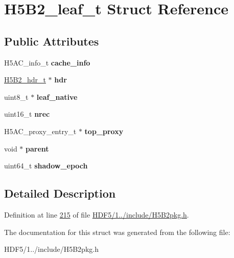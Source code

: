 \hypertarget{struct_h5_b2__leaf__t}{}\section{H5\+B2\+\_\+leaf\+\_\+t Struct Reference}
\label{struct_h5_b2__leaf__t}
\subsection*{Public Attributes}
\begin{DoxyCompactItemize}
\item 
\mbox{\label{struct_h5_b2__leaf__t_a804fee118c703417b7acca25cd627eda}} 
H5\+A\+C\+\_\+info\+\_\+t {\bfseries cache\+\_\+info}
\item 
\mbox{\label{struct_h5_b2__leaf__t_ae326044c2d829b66e1a9bde3e0ae09bc}} 
\hyperlink{struct_h5_b2__hdr__t}{H5\+B2\+\_\+hdr\+\_\+t} $\ast$ {\bfseries hdr}
\item 
\mbox{\label{struct_h5_b2__leaf__t_adacb0926a7bd038a30141629040e357d}} 
uint8\+\_\+t $\ast$ {\bfseries leaf\+\_\+native}
\item 
\mbox{\label{struct_h5_b2__leaf__t_adca946f053f22ff0dd5d26ead3487a3b}} 
uint16\+\_\+t {\bfseries nrec}
\item 
\mbox{\label{struct_h5_b2__leaf__t_ad12a0eeb297e28b97c6ad26824926f58}} 
H5\+A\+C\+\_\+proxy\+\_\+entry\+\_\+t $\ast$ {\bfseries top\+\_\+proxy}
\item 
\mbox{\label{struct_h5_b2__leaf__t_a54fc83eb3ccb8a5ff2a91a927547f4b2}} 
void $\ast$ {\bfseries parent}
\item 
\mbox{\label{struct_h5_b2__leaf__t_aaf349a05eab93dc03f529c14e1a95afa}} 
uint64\+\_\+t {\bfseries shadow\+\_\+epoch}
\end{DoxyCompactItemize}


\subsection{Detailed Description}


Definition at line \hyperlink{_h_d_f5_21_810_81_2include_2_h5_b2pkg_8h_source_l00215}{215} of file \hyperlink{_h_d_f5_21_810_81_2include_2_h5_b2pkg_8h_source}{H\+D\+F5/1../include/\+H5\+B2pkg.\+h}.



The documentation for this struct was generated from the following file\+:\begin{DoxyCompactItemize}
\item 
H\+D\+F5/1../include/\+H5\+B2pkg.\+h\end{DoxyCompactItemize}
